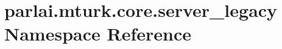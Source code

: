 \hypertarget{namespaceparlai_1_1mturk_1_1core_1_1server__legacy}{}\section{parlai.\+mturk.\+core.\+server\+\_\+legacy Namespace Reference}
\label{namespaceparlai_1_1mturk_1_1core_1_1server__legacy}
